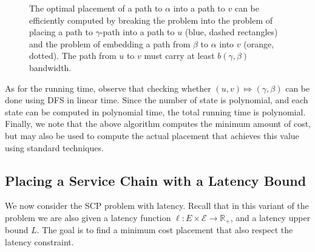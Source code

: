 \documentclass[11pt]{article}
\newcommand{\reals}{\mathbb{R}}
\newcommand{\scp}{\textsc{SCP}\xspace}
\newcommand{\calE}{\mathcal{E}}
\begin{document}
\begin{figure}[t]
\centering
\scalebox{0.9}{

}
\caption{The optimal placement of a path to $\alpha$ into a path to
  $v$ can be efficiently computed by breaking the problem into the
  problem of placing a path to $\gamma$-path into a path to $u$ (blue,
  dashed rectangles) and the problem of embedding a path from $\beta$
  to $\alpha$ into $v$ (orange, dotted).  The path from $u$ to $v$
  must carry at least $b(\gamma,\beta)$ bandwidth.  }
\label{fig:dp1}
\end{figure}

As for the running time, observe that checking whether $(u, v) \Mapsto
(\gamma,\beta)$ can be done using DFS in linear time.
%
Since the number of state is polynomial, and each state can be
computed in polynomial time, the total running time is polynomial.
Finally, we note that the above algorithm computes the minimum amount
of cost, but may also be used to compute the actual placement
that achieves this value using standard techniques.


\subsection{Placing a Service Chain with a Latency Bound}
\label{sub:DPL}

We now consider the \scp problem with latency.  Recall that in this
variant of the problem we are also given a latency function $\ell: E
\times \calE \to \reals_+$, and a latency upper bound $L$.  The goal
is to find a minimum cost placement that also respect the latency
constraint.
\end{document}
